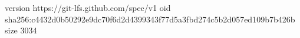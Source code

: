 version https://git-lfs.github.com/spec/v1
oid sha256:c4432d0b50292e9dc70f6d2d4399343f77d5a3fbd274c5b2d057ed109b7b426b
size 3034
